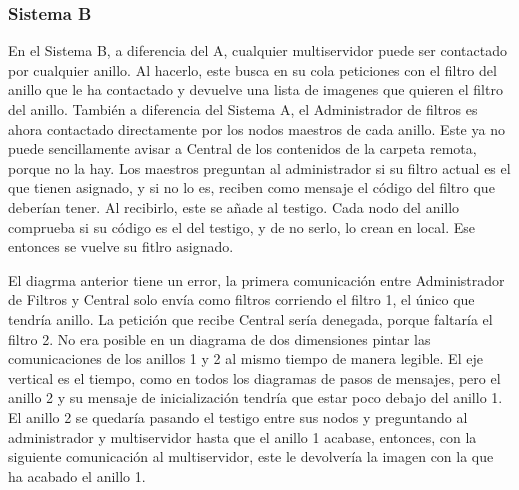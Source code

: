 \documentclass{article}
\begin{document}
\begin{flushleft}
			\subsubsection{Sistema B}
			En el Sistema B, a diferencia del A, cualquier multiservidor puede ser contactado por cualquier anillo. Al hacerlo, este busca en su cola peticiones con el filtro del anillo que le ha contactado y devuelve una lista de imagenes que quieren el filtro del anillo. También a diferencia del Sistema A, el Administrador de filtros es ahora contactado directamente por los nodos maestros de cada anillo. Este ya no puede sencillamente avisar a Central de los contenidos de la carpeta remota, porque no la hay. Los maestros preguntan al administrador si su filtro actual es el que tienen asignado, y si no lo es, reciben como mensaje el código del filtro que deberían tener. Al recibirlo, este se añade al testigo. Cada nodo del anillo comprueba si su código es el del testigo, y de no serlo, lo crean en local. Ese entonces se vuelve su fitlro asignado.
			\linebreak
			
			\hspace*{-1cm}
			
			El diagrma anterior tiene un error, la primera comunicación entre Administrador de Filtros y Central solo envía como filtros corriendo el filtro 1, el único que tendría anillo. La petición que recibe Central sería denegada, porque faltaría el filtro 2. No era posible en un diagrama de dos dimensiones pintar las comunicaciones de los anillos 1 y 2 al mismo tiempo de manera legible. El eje vertical es el tiempo, como en todos los diagramas de pasos de mensajes, pero el anillo 2 y su mensaje de inicialización tendría que estar poco debajo del anillo 1. El anillo 2 se quedaría pasando el testigo entre sus nodos y preguntando al administrador y multiservidor hasta que el anillo 1 acabase, entonces, con la siguiente comunicación al multiservidor, este le devolvería la imagen con la que ha acabado el anillo 1.
			\linebreak
			

\end{flushleft}
\end{document}
